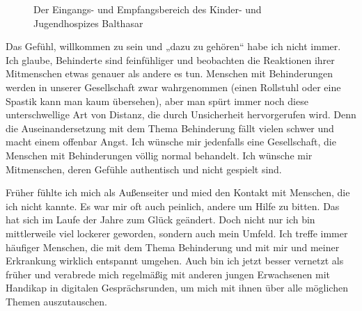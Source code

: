 \documentclass[fontsize=14pt,a4paper,headinclude,DIV=calc,automark]{scrbook}
\begin{document}
\setlength{\fboxsep}{0pt}    %
\setlength{\fboxrule}{0.2pt} %
\begin{figure}[ht]
    \raggedright
    \caption{Der Eingangs- und Empfangsbereich des Kinder- und Jugendhospizes Balthasar}
    \label{fig:willkommen}
\end{figure}

Das Gefühl, willkommen zu sein und „dazu zu gehören“ habe ich nicht immer. Ich glaube, Behinderte sind feinfühliger und beobachten die Reaktionen ihrer Mitmenschen etwas genauer als andere es tun. Menschen mit Behinderungen werden in unserer Gesellschaft zwar wahrgenommen (einen Rollstuhl oder eine Spastik kann man kaum übersehen), aber man spürt immer noch diese unterschwellige Art von Distanz, die durch Unsicherheit hervorgerufen wird. Denn die Auseinandersetzung mit dem Thema Behinderung fällt vielen schwer und macht einem offenbar Angst. Ich wünsche mir jedenfalls eine Gesellschaft, die Menschen mit Behinderungen völlig normal behandelt. Ich wünsche mir Mitmenschen, deren Gefühle authentisch und nicht gespielt sind.

Früher fühlte ich mich als Außenseiter und mied den Kontakt mit Menschen, die ich nicht kannte. Es war mir oft auch peinlich, andere um Hilfe zu bitten. Das hat sich im Laufe der Jahre zum Glück geändert. Doch nicht nur ich bin mittlerweile viel lockerer geworden, sondern auch mein Umfeld. Ich treffe immer häufiger Menschen, die mit dem Thema Behinderung und mit mir und meiner Erkrankung wirklich entspannt umgehen. Auch bin ich jetzt besser vernetzt als früher und verabrede mich regelmäßig mit anderen jungen Erwachsenen mit Handikap in digitalen Gesprächsrunden, um mich mit ihnen über alle möglichen Themen auszutauschen.
\end{document}
